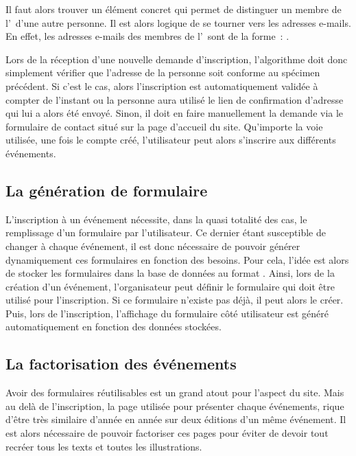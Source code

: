 Il faut alors trouver un élément concret qui permet de distinguer un membre de l'\univ\ d'une autre personne. Il est alors logique de se tourner vers les adresses e-mails. En effet, les adresses e-mails des membres de l'\univ\ sont de la forme~: .

Lors de la réception d'une nouvelle demande d'inscription, l'algorithme doit donc simplement vérifier que l'adresse  de la personne soit conforme au spécimen précédent. Si c'est le cas, alors l'inscription est automatiquement validée à compter de l'instant ou la personne aura utilisé le lien de confirmation d'adresse qui lui a alors été envoyé. Sinon, il doit en faire manuellement la demande via le formulaire de contact situé sur la page d'accueil du site. Qu'importe la voie utilisée, une fois le compte créé, l'utilisateur peut alors s'inscrire aux différents événements.

\subsection{La génération de formulaire}
\label{subsec:generation-formulaire}

L'inscription à un événement nécessite, dans la quasi totalité des cas, le remplissage d'un formulaire par l'utilisateur. Ce dernier étant susceptible de changer à chaque événement, il est donc nécessaire de pouvoir générer dynamiquement ces formulaires en fonction des besoins. Pour cela, l'idée est alors de stocker les formulaires dans la base de données au format . Ainsi, lors de la création d'un événement, l'organisateur peut définir le formulaire qui doit être utilisé pour l'inscription. Si ce formulaire n'existe pas déjà, il peut alors le créer. Puis, lors de l'inscription, l'affichage du formulaire côté utilisateur est généré automatiquement en fonction des données stockées.

\subsection{La factorisation des événements}
\label{subsec:factorisation-evenements}

Avoir des formulaires réutilisables est un grand atout pour l'aspect  du site. Mais au delà de l'inscription, la page utilisée pour présenter chaque événements, rique d'être très similaire d'année en année sur deux éditions d'un même événement. Il est alors nécessaire de pouvoir factoriser ces pages pour éviter de devoir tout recréer tous les texts et toutes les illustrations.
\bigskip

